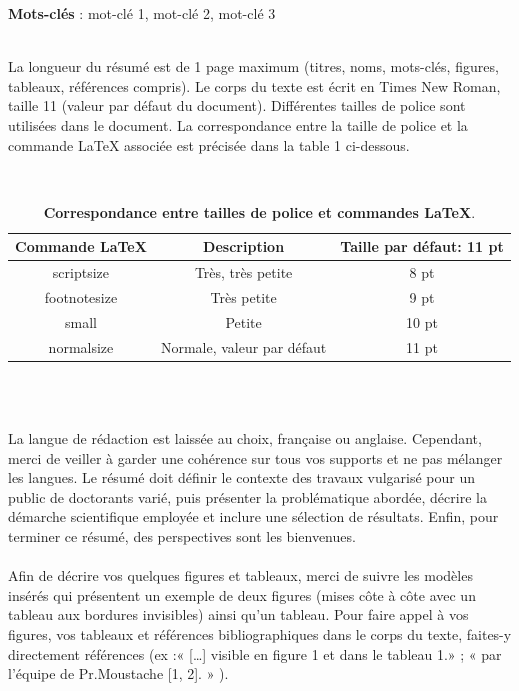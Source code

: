 \documentclass[11pt,a4paper]{article}
\begin{document}
\setlength\parindent{0em} \normalsize{ \textbf{Mots-clés} : mot-clé 1, mot-clé 2, mot-clé 3 }
\\
\\
    \normalsize{
    La longueur du résumé est de 1 page maximum (titres, noms, mots-clés, figures, tableaux, références compris). Le corps du texte est écrit en Times New Roman, taille 11 (valeur par défaut du document). Différentes tailles de police sont utilisées dans le document. La correspondance entre la taille de police et la commande LaTeX associée est précisée dans la table 1 ci-dessous.
    
    }
\\
\begin{table}[h!]
    \centering
    \begin{tabular}{|c|c|c|} 
     \hline
        Commande LaTeX   & Description & Taille par défaut: 11 pt \\ 
    \hline
         scriptsize   & Très, très petite & 8 pt \\ 
    \hline
        footnotesize  & Très petite & 9 pt \\
    \hline
         small & Petite & 10 pt \\
    \hline
        normalsize & Normale, valeur par défaut & 11 pt \\
    \hline
    \end{tabular}
    \caption{{\footnotesize\textbf{Correspondance entre tailles de police et commandes LaTeX}. }}
    \label{table:1}
\end{table}
\\
\\
    \normalsize{
    La langue de rédaction est laissée au choix, française ou anglaise. Cependant, merci de veiller à garder une cohérence sur tous vos supports et ne pas mélanger les langues. Le résumé doit définir le contexte des travaux vulgarisé pour un public de doctorants varié, puis présenter la problématique abordée, décrire la démarche scientifique employée et inclure une sélection de résultats. Enfin, pour terminer ce résumé, des perspectives sont les bienvenues.
\\
\\
    Afin de décrire vos quelques figures et tableaux, merci de suivre les modèles insérés qui présentent un exemple de deux figures (mises côte à côte avec un tableau aux bordures invisibles) ainsi qu’un tableau. Pour faire appel à vos figures, vos tableaux et références bibliographiques dans le corps du texte, faites-y directement références (ex :« […] visible en figure 1 et dans le tableau 1.» ; « par l’équipe de Pr.Moustache [1, 2]. » ).

    }
\end{document}
